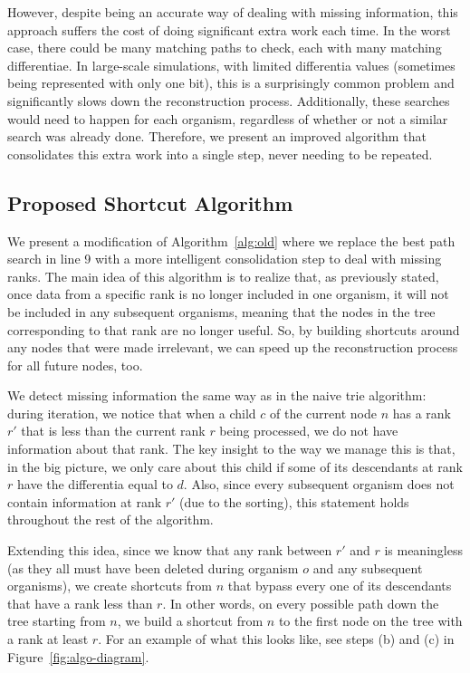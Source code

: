 However, despite being an accurate way of dealing with missing information, this approach suffers the cost of doing significant extra work each time.
In the worst case, there could be many matching paths to check, each with many matching differentiae.
In large-scale simulations, with limited differentia values (sometimes being represented with only one bit), this is a surprisingly common problem and significantly slows down the reconstruction process.
Additionally, these searches would need to happen for each organism, regardless of whether or not a similar search was already done.
Therefore, we present an improved algorithm that consolidates this extra work into a single step, never needing to be repeated.

\subsection{Proposed Shortcut Algorithm} \label{sec:algorithm:shortcut}

We present a modification of Algorithm~\ref{alg:old} where we replace the best path search in line 9 with a more intelligent consolidation step to deal with missing ranks. The main idea of this algorithm is to realize that, as previously stated, once data from a specific rank is no longer included in one organism, it will not be included in any subsequent organisms, meaning that the nodes in the tree corresponding to that rank are no longer useful. So, by building shortcuts around any nodes that were made irrelevant, we can speed up the reconstruction process for all future nodes, too.

We detect missing information the same way as in the naive trie algorithm: during iteration, we notice that when a child $c$ of the current node $n$ has a rank $r'$ that is less than the current rank $r$ being processed, we do not have information about that rank. The key insight to the way we manage this is that, in the big picture, we only care about this child if some of its descendants at rank $r$ have the differentia equal to $d$. Also, since every subsequent organism does not contain information at rank $r'$ (due to the sorting), this statement holds throughout the rest of the algorithm.



Extending this idea, since we know that any rank between $r'$ and $r$ is meaningless (as they all must have been deleted during organism $o$ and any subsequent organisms), we create shortcuts from $n$ that bypass every one of its descendants that have a rank less than $r$.
In other words, on every possible path down the tree starting from $n$, we build a shortcut from $n$ to the first node on the tree with a rank at least $r$. For an example of what this looks like, see steps (b) and (c) in Figure~\ref{fig:algo-diagram}.

